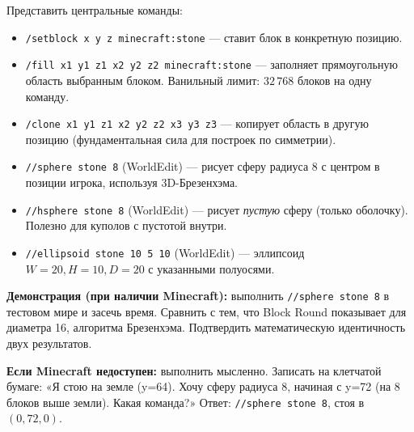 \documentclass[12pt,a4paper]{scrartcl}
\newcommand{\cmd}[1]{\textcolor{earth}{\texttt{\small #1}}}
\newcommand{\tempo}[1]{\textnormal{\footnotesize\color{bg!90!white}\textsf{#1}}}
\begin{document}
\begin{zadanie}[4.2 --- Команды Minecraft \quad\tempo{15 мин}]\label{at:42}
Представить центральные команды:

\begin{itemize}[leftmargin=1.4em,itemsep=0.25em,topsep=0.3em]
  \item \cmd{/setblock x y z minecraft:stone} --- ставит блок в конкретную позицию.
  \item \cmd{/fill x1 y1 z1 x2 y2 z2 minecraft:stone} --- заполняет прямоугольную область выбранным блоком. Ванильный лимит: $32\,768$ блоков на одну команду.
  \item \cmd{/clone x1 y1 z1 x2 y2 z2 x3 y3 z3} --- копирует область в другую позицию (фундаментальная сила для построек по симметрии).
  \item \cmd{//sphere stone 8} (WorldEdit) --- рисует сферу радиуса 8 с центром в позиции игрока, используя 3D-Брезенхэма.
  \item \cmd{//hsphere stone 8} (WorldEdit) --- рисует \emph{пустую} сферу (только оболочку). Полезно для куполов с пустотой внутри.
  \item \cmd{//ellipsoid stone 10 5 10} (WorldEdit) --- эллипсоид $W = 20, H = 10, D = 20$ с указанными полуосями.
\end{itemize}

\textbf{Демонстрация (при наличии Minecraft):} выполнить \cmd{//sphere stone 8} в тестовом мире и засечь время. Сравнить с тем, что Block Round показывает для диаметра 16, алгоритма Брезенхэма. Подтвердить математическую идентичность двух результатов.

\textbf{Если Minecraft недоступен:} выполнить мысленно. Записать на клетчатой бумаге: «Я стою на земле (y=64). Хочу сферу радиуса 8, начиная с y=72 (на 8 блоков выше земли). Какая команда?» Ответ: \cmd{//sphere stone 8}, стоя в $(0, 72, 0)$.
\end{zadanie}
\end{document}
